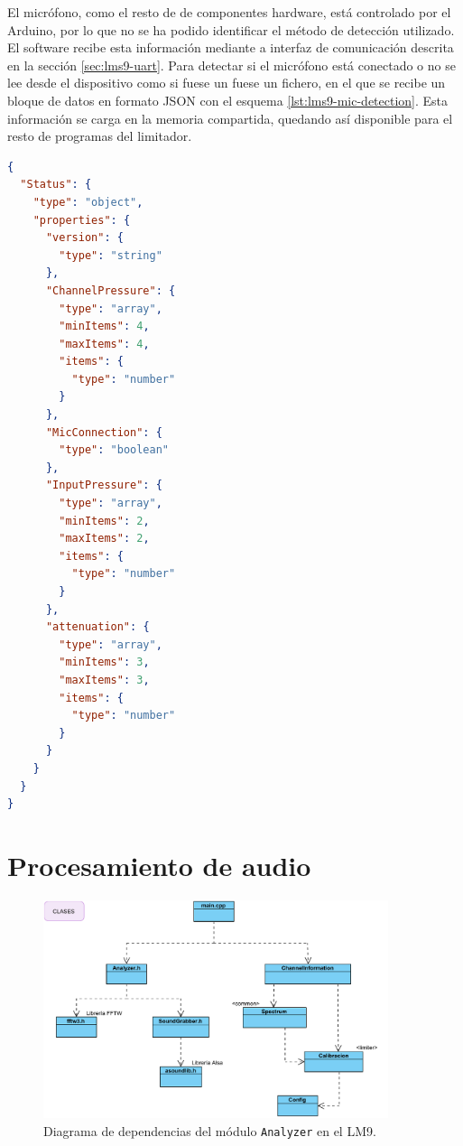 El micrófono, como el resto de de componentes hardware, está controlado por el Arduino, por lo que no se ha podido identificar el método de detección utilizado. El software recibe esta información mediante a interfaz de comunicación descrita en la sección \ref{sec:lms9-uart}. Para detectar si el micrófono está conectado o no se lee desde el dispositivo como si fuese un fuese un fichero, en el que se recibe un bloque de datos en formato JSON con el esquema \ref{lst:lms9-mic-detection}. Esta información se carga en la memoria compartida, quedando así disponible para el resto de programas del limitador. \\

\begin{lstlisting}[language=json, caption={Lectura del estado del micrófono en el LM9.}, label={lst:lms9-mic-detection}]
{
  "Status": {
    "type": "object",
    "properties": {
      "version": {
        "type": "string"
      },
      "ChannelPressure": {
        "type": "array",
        "minItems": 4,
        "maxItems": 4,
        "items": {
          "type": "number"
        }
      },
      "MicConnection": {
        "type": "boolean"
      },
      "InputPressure": {
        "type": "array",
        "minItems": 2,
        "maxItems": 2,
        "items": {
          "type": "number"
        }
      },
      "attenuation": {
        "type": "array",
        "minItems": 3,
        "maxItems": 3,
        "items": {
          "type": "number"
        }
      }
    }
  }
}
\end{lstlisting}



\clearpage
\section{Procesamiento de audio}

\begin{figure}[h]
    \centering
    \includegraphics[width=0.9\textwidth]{figuras/lms9-analyzer.pdf}
    \caption{Diagrama de dependencias del módulo \texttt{Analyzer} en el LM9.}
    \label{fig:lm9-analyzer}
\end{figure}

